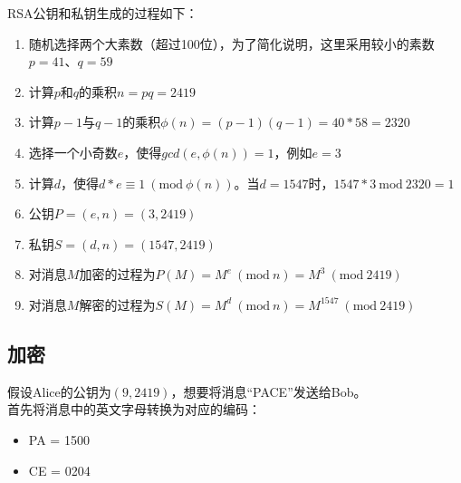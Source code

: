 RSA公钥和私钥生成的过程如下：

\begin{enumerate}
    \item 随机选择两个大素数（超过100位），为了简化说明，这里采用较小的素数$ p = 41 $、$ q = 59 $

    \item 计算$ p $和$ q $的乘积$ n = pq = 2419 $

    \item 计算$ p - 1 $与$ q - 1 $的乘积$ \phi(n) = (p-1)(q-1) = 40 * 58 = 2320 $

    \item 选择一个小奇数$ e $，使得$ gcd(e, \phi(n)) = 1$，例如$ e = 3 $

    \item 计算$ d $，使得$ d * e \equiv 1\ (\text{mod}\ \phi(n)) $。当$ d = 1547 $时，$ 1547 * 3\ \text{mod}\ 2320 = 1 $

    \item 公钥$ P = (e, n) = (3, 2419) $

    \item 私钥$ S = (d, n) = (1547, 2419) $

    \item 对消息$ M $加密的过程为$ P(M) = M^e\ (\text{mod}\ n) = M^3\ (\text{mod}\ 2419) $

    \item 对消息$ M $解密的过程为$ S(M) = M^d\ (\text{mod}\ n) = M^{1547}\ (\text{mod}\ 2419) $
\end{enumerate}

\vspace{0.5cm}

\subsection{加密}

假设Alice的公钥为$ (9, 2419) $，想要将消息“PACE”发送给Bob。\\

首先将消息中的英文字母转换为对应的编码：

\begin{itemize}
    \item PA = 1500
    \item CE = 0204
\end{itemize}

